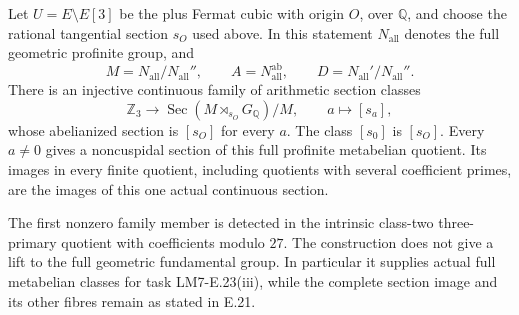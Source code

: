 \begin{theorem}
\label{E-full-metabelian-family}
Let $U=E\setminus E[3]$ be the plus Fermat cubic with origin
$O$, over $\mathbb Q$, and choose the rational tangential section
$s_O$ used above. In this statement $N_{\mathrm{all}}$ denotes
the full geometric profinite group, and
\[
 M=N_{\mathrm{all}}/N_{\mathrm{all}}'',\qquad
 A=N_{\mathrm{all}}^{\mathrm{ab}},\qquad
 D=N_{\mathrm{all}}'/N_{\mathrm{all}}''.
\]
There is an injective continuous family of arithmetic section classes
\[
 \mathbb Z_3\longrightarrow
 \operatorname{Sec}(M\rtimes_{s_O}G_{\mathbb Q})/M,
       \qquad a\longmapsto[s_a],
 \tag{E.31.1}
\]
whose abelianized section is $[s_O]$ for every $a$.
The class $[s_0]$ is $[s_O]$. Every $a\ne0$ gives a
noncuspidal section of this full profinite metabelian quotient.
Its images in every finite quotient, including quotients with
several coefficient primes, are the images of this one actual
continuous section.

The first nonzero family member is detected in the intrinsic
class-two three-primary quotient with coefficients modulo $27$.
The construction does not give a lift to the full geometric
fundamental group. In particular it supplies actual full
metabelian classes for task LM7-E.23(iii), while the complete
section image and its other fibres remain as stated in E.21.
\end{theorem}
